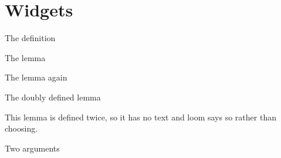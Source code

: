 \section{Widgets}\label{sy-0400}

\begin{frame}{The definition}

\end{frame}

\begin{frame}{The lemma}

\end{frame}

\begin{frame}{The lemma again}

\end{frame}

\begin{frame}{The doubly defined lemma}
\begin{lemma}\label{sy-999B}
This lemma is defined twice, so it has no text and loom says so rather than choosing.
\end{lemma}
\end{frame}

\begin{frame}{Two arguments}

\end{frame}

